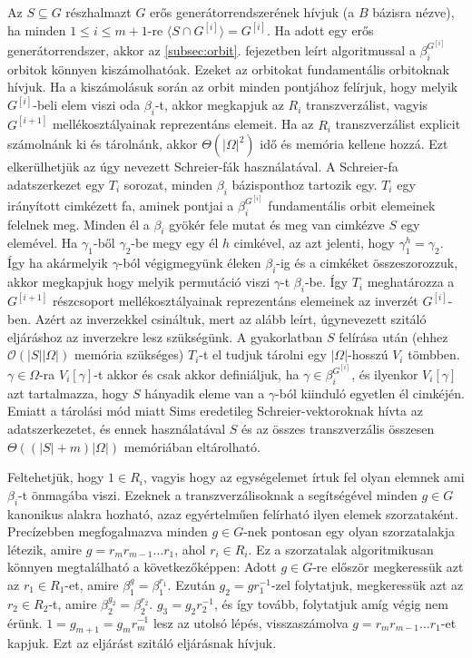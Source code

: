 Az $S \subseteq G$ részhalmazt $G$ erős generátorrendszerének hívjuk (a $B$ bázisra nézve), ha minden $1\le i \le m+1$-re $\langle S \cap G^{[i]} \rangle = G^{[i]}$.
Ha adott egy erős generátorrendszer, akkor az \ref{subsec:orbit}. fejezetben leírt algoritmussal a $\beta_i^{G^{[i]}}$ orbitok könnyen kiszámolhatóak.
Ezeket az orbitokat fundamentális orbitoknak hívjuk.
Ha a kiszámolásuk során az orbit minden pontjához felírjuk, hogy melyik $G^{[i]}$-beli elem viszi oda $\beta_i$-t, akkor megkapjuk az $R_i$ transzverzálist,
vagyis $G^{[i+1]}$ mellékosztályainak reprezentáns elemeit.
Ha az $R_i$ transzverzálist explicit számolnánk ki és tárolnánk, akkor $\Theta(|\Omega|^2)$ idő és memória kellene hozzá.
Ezt elkerülhetjük az úgy nevezett Schreier-fák használatával.
A Schreier-fa adatszerkezet egy $T_i$ sorozat, minden $\beta_i$ bázisponthoz tartozik egy.
$T_i$ egy irányított cimkézett fa, aminek pontjai a $\beta_i^{G^{[i]}}$ fundamentális orbit elemeinek felelnek meg.
Minden él a $\beta_i$ gyökér fele mutat és meg van cimkézve $S$ egy elemével.
Ha $\gamma_1$-ből $\gamma_2$-be megy egy él $h$ cimkével, az azt jelenti, hogy $\gamma_1^h=\gamma_2$.
Így ha akármelyik $\gamma$-ból végigmegyünk éleken $\beta_i$-ig és a cimkéket összeszorozzuk, akkor megkapjuk hogy melyik
permutáció viszi $\gamma$-t $\beta_i$-be. Így $T_i$ meghatározza a $G^{[i+1]}$ részcsoport mellékosztályainak 
reprezentáns elemeinek az inverzét $G^{[i]}$-ben. Azért az inverzekkel csináltuk, mert az alább leírt, úgynevezett szitáló eljáráshoz az inverzekre lesz szükségünk.
A gyakorlatban $S$ felírása után (ehhez $\mathcal{O}(|S||\Omega|)$ memória szükséges) $T_i$-t el tudjuk tárolni egy $|\Omega|$-hosszú $V_i$ tömbben.
$\gamma \in \Omega$-ra $V_i[\gamma]$-t akkor és csak akkor definiáljuk, ha $\gamma \in \beta_i^{G^{[i]}}$,
és ilyenkor $V_i[\gamma]$ azt tartalmazza, hogy $S$ hányadik eleme van a $\gamma$-ból kiinduló egyetlen él cimkéjén.
Emiatt a tárolási mód miatt Sims eredetileg Schreier-vektoroknak hívta az adatszerkezetet, és ennek használatával $S$ és az összes transzverzális összesen $\Theta((|S|+m)|\Omega|)$ memóriában eltárolható.

Feltehetjük, hogy $1 \in R_i$, vagyis hogy az egységelemet írtuk fel olyan elemnek ami $\beta_i$-t önmagába viszi.
Ezeknek a transzverzálisoknak a segítségével minden $g \in G$ kanonikus alakra hozható, azaz egyértelműen felírható ilyen elemek szorzataként.
Precízebben megfogalmazva minden $g \in G$-nek pontosan egy olyan szorzatalakja létezik, amire $g = r_m r_{m-1} \dots r_1$, ahol $r_i \in R_i$.
Ez a szorzatalak algoritmikusan könnyen megtalálható a következőképpen: Adott $g \in G$-re először megkeressük azt az $r_1 \in R_1$-et, amire $\beta_1^g = \beta_1^{r_1}$.
Ezután $g_2 = g r_1^{-1}$-zel folytatjuk, megkeressük azt az $r_2 \in R_2$-t, amire $\beta_2^{g_2} = \beta_2^{r_2}$. $g_3 = g_2 r_2^{-1}$, és így tovább, folytatjuk amíg végig nem érünk.
$1 = g_{m+1} = g_{m} r_m^{-1}$ lesz az utolsó lépés, visszaszámolva $g = r_m r_{m-1} \dots r_1$-et kapjuk. Ezt az eljárást szitáló eljárásnak hívjuk.

